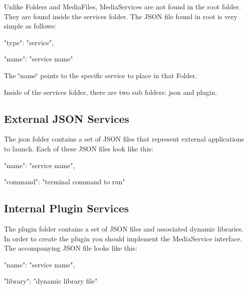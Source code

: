 Unlike {\ttfamily Folder}s and {\ttfamily Media\-File}s, {\ttfamily Media\-Service}s are not found in the {\ttfamily root} folder. They are found inside the {\ttfamily services} folder. The J\-S\-O\-N file found in {\ttfamily root} is very simple as follows\-: \begin{DoxyVerb}{
    "type": "service",

    "name": "service name"
}
\end{DoxyVerb}


The {\ttfamily \char`\"{}name\char`\"{}} points to the specific service to place in that {\ttfamily Folder}.

Inside of the {\ttfamily services} folder, there are two sub folders\-: {\ttfamily json} and {\ttfamily plugin}.

\subsection*{External J\-S\-O\-N Services}

The {\ttfamily json} folder contains a set of J\-S\-O\-N files that represent external applications to launch. Each of these J\-S\-O\-N files look like this\-: \begin{DoxyVerb}{
    "name": "service name",

    "command": "terminal command to run"
}
\end{DoxyVerb}


\subsection*{Internal Plugin Services}

The {\ttfamily plugin} folder contains a set of J\-S\-O\-N files and associated dynamic libraries. In order to create the plugin you should implement the {\ttfamily Media\-Service} interface. The accompanying J\-S\-O\-N file looks like this\-: \begin{DoxyVerb}{
    "name": "service name",

    "library": "dynamic library file"
}
\end{DoxyVerb}
 